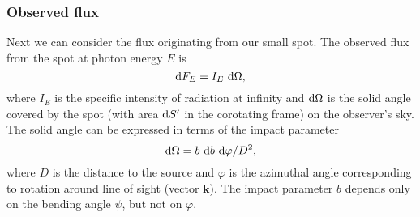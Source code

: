 \documentclass{wihuri}
\def\be{\begin{equation}}
\def\ee{\end{equation}}
\def\d{{\rm d}}
\def\Dop{\delta}
\newcommand{\bmath}[1]{\boldsymbol{#1}}
\begin{document}
\subsubsection{Observed flux}

Next we can consider the flux originating from our small spot. The observed flux from the spot at photon energy $E$ is
\be
\label{eq:dF_E2}
  \d F_E=I_E\ \d\Omega,
\ee
where $I_E$ is the specific intensity of radiation at infinity and $\d\Omega$ is
the solid angle covered by the spot (with area $\d S'$ in the corotating frame) on the observer's sky.
The solid angle can be expressed in terms of the impact parameter \cite{pechenick}
\be
\d\Omega=b\ \d b\ \d\varphi/D^2,
\ee
where $D$ is the distance to the source and $\varphi$ is the azimuthal
angle corresponding to rotation around line of sight (vector $\bmath{k}$).
The impact parameter $b$ depends only on the bending angle $\psi$, but not on $\varphi$.

\end{document}
